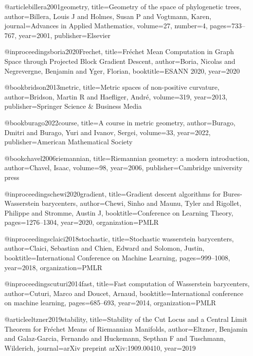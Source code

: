 @article{billera2001geometry,
  title={Geometry of the space of phylogenetic trees},
  author={Billera, Louis J and Holmes, Susan P and Vogtmann, Karen},
  journal={Advances in Applied Mathematics},
  volume={27},
  number={4},
  pages={733--767},
  year={2001},
  publisher={Elsevier}
}



@inproceedings{boria2020Frechet,
  title={{F}r{\'e}chet Mean Computation in Graph Space through Projected Block Gradient Descent},
  author={Boria, Nicolas and Negrevergne, Benjamin and Yger, Florian},
  booktitle={ESANN 2020},
  year={2020}
}



@book{bridson2013metric,
  title={Metric spaces of non-positive curvature},
  author={Bridson, Martin R and Haefliger, Andr{\'e}},
  volume={319},
  year={2013},
  publisher={Springer Science \& Business Media}
}

@book{burago2022course,
  title={A course in metric geometry},
  author={Burago, Dmitri and Burago, Yuri and Ivanov, Sergei},
  volume={33},
  year={2022},
  publisher={American Mathematical Society}
}

@book{chavel2006riemannian,
  title={Riemannian geometry: a modern introduction},
  author={Chavel, Isaac},
  volume={98},
  year={2006},
  publisher={Cambridge university press}
}

@inproceedings{chewi2020gradient,
  title={Gradient descent algorithms for {B}ures-{W}asserstein barycenters},
  author={Chewi, Sinho and Maunu, Tyler and Rigollet, Philippe and Stromme, Austin J},
  booktitle={Conference on Learning Theory},
  pages={1276--1304},
  year={2020},
  organization={PMLR}
}


@inproceedings{claici2018stochastic,
  title={Stochastic wasserstein barycenters},
  author={Claici, Sebastian and Chien, Edward and Solomon, Justin},
  booktitle={International Conference on Machine Learning},
  pages={999--1008},
  year={2018},
  organization={PMLR}
}


@inproceedings{cuturi2014fast,
  title={Fast computation of Wasserstein barycenters},
  author={Cuturi, Marco and Doucet, Arnaud},
  booktitle={International conference on machine learning},
  pages={685--693},
  year={2014},
  organization={PMLR}
}


@article{eltzner2019stability,
  title={Stability of the Cut Locus and a Central Limit Theorem for {F}réchet Means of {R}iemannian Manifolds},
  author={Eltzner, Benjamin and Galaz-Garcia, Fernando and Huckemann, Septhan F and Tuschmann, Wilderich},
  journal={arXiv preprint arXiv:1909.00410},
  year={2019}
}

